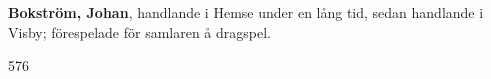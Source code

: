 \textbf{Bokström, Johan}, handlande i Hemse under en lång tid, sedan handlande i Visby; förespelade för samlaren å dragspel. 

576 
